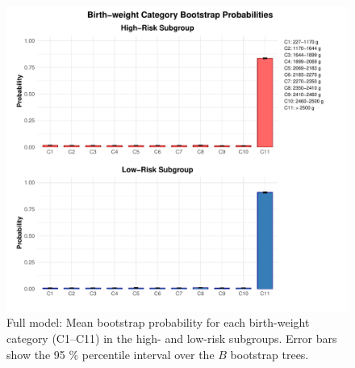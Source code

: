 
\begin{figure}[H]
  \centering
  \includegraphics[width=\textwidth]{chapters/chapter3/figures/high_low_risk_full.pdf}
  \caption{Full model: Mean bootstrap probability for each birth-weight category (C1–C11) in the high- and low-risk subgroups. Error bars show the 95 \% percentile interval over the $B$ bootstrap trees.}
  \label{fig:high-low-risk-full}
\end{figure}

